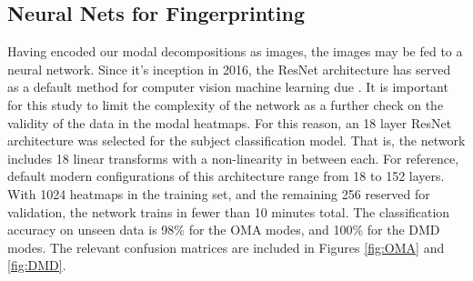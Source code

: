 \subsection{Neural Nets for Fingerprinting}
Having encoded our modal decompositions as images, the images may be fed to a neural network. Since it's inception in 2016, the ResNet architecture has served as a default method for computer vision machine learning due \cite{he2016deep}. It is important for this study to limit the complexity of the network as a further check on the validity of the data in the modal heatmaps. For this reason, an 18 layer ResNet architecture was selected for the subject classification model. That is, the network includes 18 linear transforms with a non-linearity in between each. For reference, default modern configurations of this architecture range from 18 to 152 layers. With 1024 heatmaps in the training set, and the remaining 256 reserved for validation, the network trains in fewer than 10 minutes total. The classification accuracy on unseen data is 98\% for the OMA modes, and 100\% for the DMD modes. The relevant confusion matrices are included in Figures \ref{fig:OMA} and \ref{fig:DMD}.
